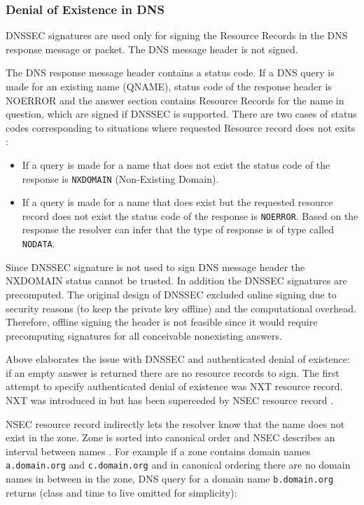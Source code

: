 \subsubsection{Denial of Existence in DNS}

DNSSEC signatures are used only for signing the Resource Records in the DNS response message or packet. The DNS message header is not signed. \citep{RFC_7129}  

The DNS response message header contains a status code. If a DNS query is made for an existing name (QNAME), status code of the response header is NOERROR and the answer section contains Resource Records for the name in question, which are signed if DNSSEC is supported. 
There are two cases of status codes corresponding to situations where requested Resource record does not exits \cite{RFC_7129}:

\begin{itemize}
 \item If a query is made for a name that does not exist the status code of the response is \texttt{NXDOMAIN} (Non-Existing Domain).  
 \item If a query is made for a name that does exist but the requested resource record does not exist the status code of the response is \texttt{NOERROR}. Based on the response the resolver can infer that the type of response is of type called \texttt{NODATA}.
\end{itemize}

Since DNSSEC signature is not used to sign DNS message header the NXDOMAIN status cannot be trusted. In addition the DNSSEC signatures are precomputed. The original design of DNSSEC excluded online signing due to security reasons (to keep the private key offline) and the computational overhead. Therefore, offline signing the header is not feasible since it would require precomputing signatures for all conceivable nonexisting answers. \citep{RFC_7129}

Above elaborates the issue with DNSSEC and authenticated denial of existence: if an empty answer is returned there are no resource records to sign. The first attempt to specify authenticated denial of existence was NXT resource record. NXT was introduced in \cite{RFC_2065} but has been superceded by NSEC resource record \cite{RFC3845}.

NSEC resource record indirectly lets the resolver know that the name does not exist in the zone. Zone is sorted into canonical order and NSEC describes an interval between names \cite{RFC4034}. For example if a zone contains domain names \texttt{a.domain.org} and \texttt{c.domain.org} and in canonical ordering there are no domain names in between in the zone, DNS query for a domain name \texttt{b.domain.org} returns (class and time to live omitted for simplicity):

